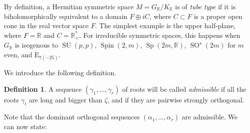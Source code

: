 \documentclass[JEP,XML,SOM,Unicode,NoFloatCountersInSection]{cedram}
\theoremstyle{plain}
\theoremstyle{definition}
\newtheorem{defi}[theo]{Definition}
\DeclareMathOperator{\SO}{SO}
\DeclareMathOperator{\SU}{SU}
\DeclareMathOperator{\Sp}{Sp}
\DeclareMathOperator{\Spin}{Spin}
\newcommand{\bR}{\mathbb{R}}
\begin{document}
By definition, a Hermitian symmetric space $M=G_\bR/K_\bR$ is of \emph{tube type} if it is biholomorphically equivalent to a domain $F\oplus i C$, where
$C \subset F$ is a proper open cone in the real vector space $F$. The simplest example is the upper
half-plane, where $F=\bR$ and $C=\bR_+^*$. For irreducible symmetric spaces,
this happens when $G_\bR$ is isogenous to $\SU(p,p)$, $\Spin(2,m)$, $\Sp(2m,\bR)$,
$\SO^\star(2m)$ for $m$ even, and $\mathrm{E}_{7(-25)}$.

We introduce the following definition.

\begin{defi}
\label{defi:admissible-sequence}
A sequence $(\gamma_1,\ldots,\gamma_r)$ of roots will be called \emph{admissible} if all the roots $\gamma_i$ are long
and bigger than $\zeta$, and if they are pairwise strongly orthogonal.
\end{defi}

Note that the dominant orthogonal sequences $(\alpha_1,\ldots,\alpha_r)$ are admissible.
We can now state:
\end{document}
